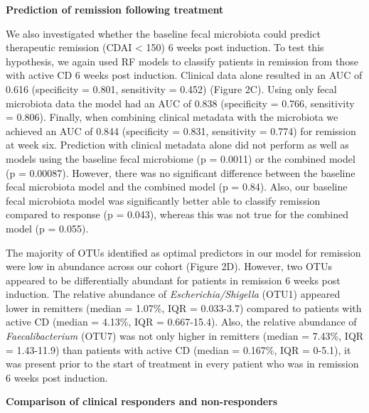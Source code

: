 \documentclass[12pt,]{article}
\begin{document}
\textbf{Prediction of remission following treatment}

We also investigated whether the baseline fecal microbiota could predict
therapeutic remission (CDAI \textless{} 150) 6 weeks post induction. To
test this hypothesis, we again used RF models to classify patients in
remission from those with active CD 6 weeks post induction. Clinical
data alone resulted in an AUC of 0.616 (specificity = 0.801, sensitivity
= 0.452) (Figure 2C). Using only fecal microbiota data the model had an
AUC of 0.838 (specificity = 0.766, sensitivity = 0.806). Finally, when
combining clinical metadata with the microbiota we achieved an AUC of
0.844 (specificity = 0.831, sensitivity = 0.774) for remission at week
six. Prediction with clinical metadata alone did not perform as well as
models using the baseline fecal microbiome (p = 0.0011) or the combined
model (p = 0.00087). However, there was no significant difference
between the baseline fecal microbiota model and the combined model (p =
0.84). Also, our baseline fecal microbiota model was significantly
better able to classify remission compared to response (p = 0.043),
whereas this was not true for the combined model (p = 0.055).

The majority of OTUs identified as optimal predictors in our model for
remission were low in abundance across our cohort (Figure 2D). However,
two OTUs appeared to be differentially abundant for patients in
remission 6 weeks post induction. The relative abundance of
\emph{Escherichia/Shigella} (OTU1) appeared lower in remitters (median =
1.07\%, IQR = 0.033-3.7) compared to patients with active CD (median =
4.13\%, IQR = 0.667-15.4). Also, the relative abundance of
\emph{Faecalibacterium} (OTU7) was not only higher in remitters (median
= 7.43\%, IQR = 1.43-11.9) than patients with active CD (median =
0.167\%, IQR = 0-5.1), it was present prior to the start of treatment in
every patient who was in remission 6 weeks post induction.

\textbf{Comparison of clinical responders and non-responders}
\end{document}
